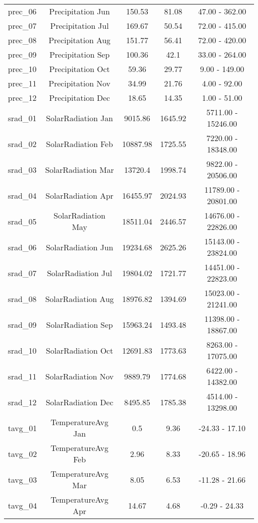 \documentclass[AutoFakeBold]{LZUThesis-PgD&PhD}
\begin{document}
\begin{longtable}[H]{lcccc}
	   prec\_06 & Precipitation Jun & 150.53 & 81.08 & 47.00 - 362.00 \\
	   prec\_07 & Precipitation Jul & 169.67 & 50.54 & 72.00 - 415.00 \\
	   prec\_08 & Precipitation Aug & 151.77 & 56.41 & 72.00 - 420.00 \\
	   prec\_09 & Precipitation Sep & 100.36 & 42.1 & 33.00 - 264.00 \\
	   prec\_10 & Precipitation Oct & 59.36 & 29.77 & 9.00 - 149.00 \\
	   prec\_11 & Precipitation Nov & 34.99 & 21.76 & 4.00 - 92.00 \\
	   prec\_12 & Precipitation Dec & 18.65 & 14.35 & 1.00 - 51.00 \\
	   srad\_01 & SolarRadiation Jan & 9015.86 & 1645.92 & 5711.00 - 15246.00 \\
	   srad\_02 & SolarRadiation Feb & 10887.98 & 1725.55 & 7220.00 - 18348.00 \\
	   srad\_03 & SolarRadiation Mar & 13720.4 & 1998.74 & 9822.00 - 20506.00 \\
	   srad\_04 & SolarRadiation Apr & 16455.97 & 2024.93 & 11789.00 - 20801.00 \\
	   srad\_05 & SolarRadiation May & 18511.04 & 2446.57 & 14676.00 - 22826.00 \\
	   srad\_06 & SolarRadiation Jun & 19234.68 & 2625.26 & 15143.00 - 23824.00 \\
	   srad\_07 & SolarRadiation Jul & 19804.02 & 1721.77 & 14451.00 - 22823.00 \\
	   srad\_08 & SolarRadiation Aug & 18976.82 & 1394.69 & 15023.00 - 21241.00 \\
	   srad\_09 & SolarRadiation Sep & 15963.24 & 1493.48 & 11398.00 - 18867.00 \\
	   srad\_10 & SolarRadiation Oct & 12691.83 & 1773.63 & 8263.00 - 17075.00 \\
	   srad\_11 & SolarRadiation Nov & 9889.79 & 1774.68 & 6422.00 - 14382.00 \\
	   srad\_12 & SolarRadiation Dec & 8495.85 & 1785.38 & 4514.00 - 13298.00 \\
	   tavg\_01 & TemperatureAvg Jan & 0.5 & 9.36 & -24.33 - 17.10 \\
	   tavg\_02 & TemperatureAvg Feb & 2.96 & 8.33 & -20.65 - 18.96 \\
	   tavg\_03 & TemperatureAvg Mar & 8.05 & 6.53 & -11.28 - 21.66 \\
	   tavg\_04 & TemperatureAvg Apr & 14.67 & 4.68 & -0.29 - 24.33 \\

\end{longtable}
\end{document}
